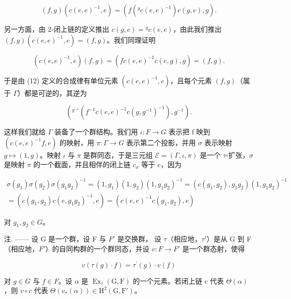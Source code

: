 \[
(f, g) (c (e, e) ^ {- 1}, e) = (f (^ {g} c (e, e) ^ {- 1}) c (g, e), g).
\]

另一方面，由 2-闭上链的定义推出 \(c(g, e) = {}^g c(e, e)\)，由此我们推出 \((f, g)(c(e, e)^{-1}, e) = (f, g)\)。我们同理证明

\[
(c (e, e) ^ {- 1}, e) (f, g) = (f c (e, e) ^ {- 1} c (e, g), g) = (f, g).
\]

于是由 (12) 定义的合成律有单位元素 \((c(e,e)^{-1},e)\)，且每个元素 \((f,g)\)（属于 \(\Gamma\)）都是可逆的，其逆为

\[
\left(^ {g ^ {- 1}} (f ^ {- 1} c (e, e) ^ {- 1} c (g, g ^ {- 1}) ^ {- 1}), g ^ {- 1}\right).
\]

这样我们就给 \(\Gamma\) 装备了一个群结构。我们用 \(\iota: F \to G\) 表示把 f 映到 \((c(e, e)^{-1}f, e)\) 的映射，用 \(\pi: \Gamma \to G\) 表示第二个投影，并用 \(\sigma\) 表示映射 \(g \mapsto (1, g)\)。映射 \(\iota\) 与 \(\pi\) 是群同态，于是三元组 \(\mathcal{E} = (\Gamma, \iota, \pi)\) 是一个 \(\tau\)-扩张，\(\sigma\) 是映射 \(\pi\) 的一个截面，并且相伴的闭上链 \(c_{\sigma}\) 等于 c，因为

\[
\begin{array}{c} \sigma (g _ {1}) \sigma (g _ {2}) \sigma (g _ {1} g _ {2}) ^ {- 1} = (1, g _ {1}) (1, g _ {2}) (1, g _ {1} g _ {2}) ^ {- 1} = (c (g _ {1}, g _ {2}), g _ {1} g _ {2}) (1, g _ {1} g _ {2}) ^ {- 1} \\ = (c (g _ {1}, g _ {2}) c (e, g _ {1} g _ {2}) ^ {- 1}, e) = (c (e, e) ^ {- 1} c (g _ {1}, g _ {2}), e) \end{array}
\]

对 \(g_{1}, g_{2} \in G\)。

注. —— 设 G 是一个群，设 F 与 \(F'\) 是交换群， 设 \(\tau\)（相应地，\(\tau'\)）是从 G 到 F（相应地，\(F'\)）的自同构群的一个群同态，并设 \(v : F \to F'\) 是一个群态射，使得

\[
v (\tau (g) \cdot f) = \tau^ {\prime} (g) \cdot v (f)\tag{13}
\]

对 \(g \in G\) 与 \(f \in F\)。设 \(\alpha\) 是 \(\operatorname{Ex}_{\tau}(\mathrm{G}, \mathrm{F})\) 的一个元素。若闭上链 c 代表 \(\Theta(\alpha)\)，则 \(v \circ c\) 代表 \(\Theta(v_{*}(\alpha)) \in \mathrm{H}^{2}(\mathrm{G}, \mathrm{F}')\)。

